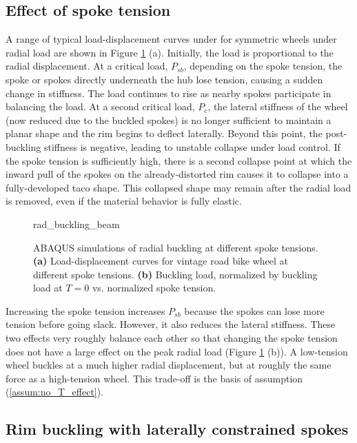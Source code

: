 \documentclass[\rootdir/thesis.tex]{subfiles}
\begin{document}
\subsection{Effect of spoke tension}

A range of typical load-displacement curves under for symmetric wheels under radial load are shown in Figure \ref{fig:rad_buckling_beam} (a). Initially, the load is proportional to the radial displacement. At a critical load, $P_{sb}$, depending on the spoke tension, the spoke or spokes directly underneath the hub lose tension, causing a sudden change in stiffness. The load continues to rise as nearby spokes participate in balancing the load. At a second critical load, $P_c$, the lateral stiffness of the wheel (now reduced due to the buckled spokes) is no longer sufficient to maintain a planar shape and the rim begins to deflect laterally. Beyond this point, the post-buckling stiffness is negative, leading to unstable collapse under load control. If the spoke tension is sufficiently high, there is a second collapse point at which the inward pull of the spokes on the already-distorted rim causes it to collapse into a fully-developed taco shape. This collapsed shape may remain after the radial load is removed, even if the material behavior is fully elastic.

\begin{figure}
\centering
{rad_buckling_beam}
\caption{ABAQUS simulations of radial buckling at different spoke tensions. \textbf{(a)} Load-displacement curves for vintage road bike wheel at different spoke tensions. \textbf{(b)} Buckling load, normalized by buckling load at $T=0$ vs. normalized spoke tension.}
\label{fig:rad_buckling_beam}
\end{figure}

Increasing the spoke tension increases $P_{sb}$ because the spokes can lose more tension before going slack. However, it also reduces the lateral stiffness. These two effects very roughly balance each other so that changing the spoke tension does not have a large effect on the peak radial load (Figure \ref{fig:rad_buckling_beam} (b)). A low-tension wheel buckles at a much higher radial displacement, but at roughly the same force as a high-tension wheel. This trade-off is the basis of assumption (\ref{assum:no_T_effect}).

\subsection{Rim buckling with laterally constrained spokes}
\end{document}
